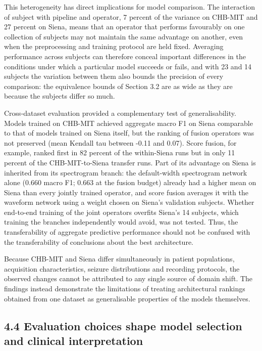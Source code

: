 \documentclass[11pt,a4paper]{article}
\begin{document}
This heterogeneity has direct implications for model comparison. The interaction of
subject with pipeline and operator, 7 percent of the variance on CHB-MIT and 27 percent on
Siena, means that an operator that performs favourably on one collection of subjects may
not maintain the same advantage on another, even when the preprocessing and training
protocol are held fixed. Averaging performance across subjects can therefore conceal
important differences in the conditions under which a particular model succeeds or
fails, and with 23 and 14 subjects the variation between them also bounds the precision
of every comparison: the equivalence bounds of Section 3.2 are as wide as they are
because the subjects differ so much.

Cross-dataset evaluation provided a complementary test of generalisability. Models
trained on CHB-MIT achieved aggregate macro F1 on Siena comparable to that of models
trained on Siena itself, but the ranking of fusion operators was not preserved (mean
Kendall tau between -0.11 and 0.07). Score fusion, for example, ranked first in 82
percent of the within-Siena runs but in only 11 percent of the CHB-MIT-to-Siena transfer
runs. Part of its advantage on Siena is inherited from its spectrogram branch: the
default-width spectrogram network alone (0.660 macro F1; 0.663 at the fusion budget) already had a higher mean on Siena than every
jointly trained operator, and score fusion averages it with the waveform network using a
weight chosen on Siena's validation subjects. Whether end-to-end training of the joint
operators overfits Siena's 14 subjects, which training the branches independently would
avoid, was not tested. Thus, the transferability of aggregate predictive performance
should not be confused with the transferability of conclusions about the best
architecture.

Because CHB-MIT and Siena differ simultaneously in patient populations, acquisition
characteristics, seizure distributions and recording protocols, the observed changes
cannot be attributed to any single source of domain shift. The findings instead
demonstrate the limitations of treating architectural rankings obtained from one dataset
as generalisable properties of the models themselves.

\subsection{4.4 Evaluation choices shape model selection and clinical interpretation}\label{evaluation-choices-shape-model-selection-and-clinical-interpretation}
\end{document}
